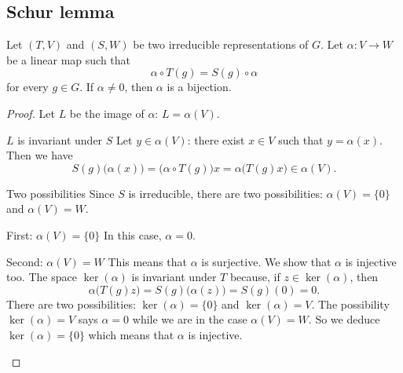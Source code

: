 \subsection{Schur lemma}

\begin{lemma}
    Let \( (T,V)\) and \( (S,W)\) be two irreducible representations of \( G\). Let \( \alpha\colon V\to W\) be a linear map such that
    \begin{equation}
        \alpha\circ T(g)=S(g)\circ \alpha
    \end{equation}
    for every \( g\in G\). If \( \alpha\neq 0\), then \( \alpha\) is a bijection.
\end{lemma}

\begin{proof}
    Let \( L\) be the image of \( \alpha\): \( L=\alpha(V)\).
    \begin{subproof}
        \item[\( L\) is invariant under \( S\)]
            Let \( y\in \alpha(V)\): there exist \( x\in V\) such that \( y=\alpha(x)\). Then we have
            \begin{equation}
                S(g)\big( \alpha(x) \big)=\big( \alpha\circ T(g) \big)x=\alpha\big( T(g)x \big)\in \alpha(V).
            \end{equation}
        \item[Two possibilities]
            Since \( S\) is irreducible, there are two possibilities: \( \alpha(V)=\{ 0 \}\) and \( \alpha(V)=W\).
        \item[First: \( \alpha(V)=\{ 0 \}\)]
            In this case, \( \alpha=0\).
        \item[Second: \( \alpha(V)=W\)]
            This means that \( \alpha\) is surjective. We show that \( \alpha\) is injective too. The space \( \ker(\alpha)\) is invariant under \( T\) because, if \( z\in \ker(\alpha)\), then
            \begin{equation}
                \alpha\big( T(g)z \big)=S(g)\big( \alpha(z) \big)=S(g)(0)=0.
            \end{equation}
            There are two possibilities: \( \ker(\alpha)=\{ 0 \}\) and \( \ker(\alpha)=V\). The possibility \( \ker(\alpha)=V\) says \( \alpha=0\) while we are in the case \( \alpha(V)=W\). So we deduce \( \ker(\alpha)=\{ 0 \}\) which means that \( \alpha\) is injective.
    \end{subproof}
\end{proof}

